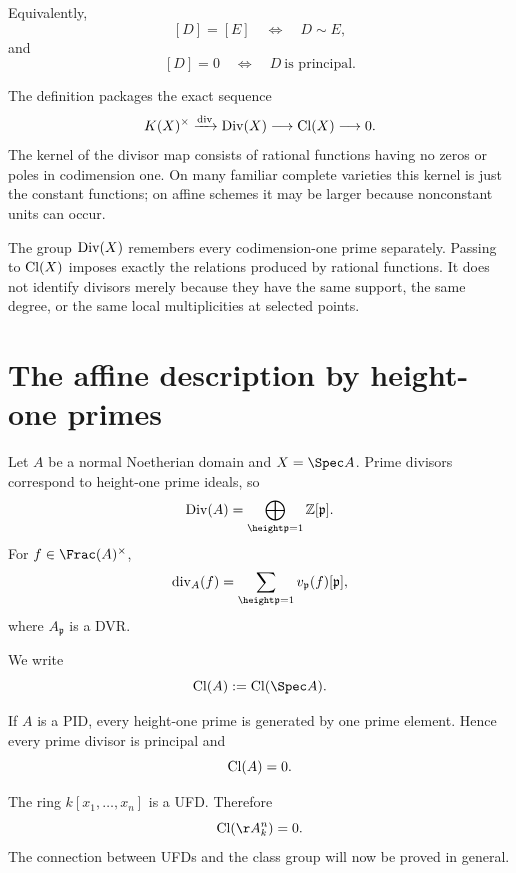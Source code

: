 Equivalently,
\[
 [D]=[E]\quad\Longleftrightarrow\quad D\sim E,
\]
and
\[
 [D]=0\quad\Longleftrightarrow\quad D\ \text{is principal}.
\]

The definition packages the exact sequence
\[
 K(X)^\times
 \xrightarrow{\operatorname{div}}
 \operatorname{Div}(X)
 \longrightarrow
 \operatorname{Cl}(X)
 \longrightarrow0.
\]
The kernel of the divisor map consists of rational functions having no zeros or poles in codimension one. On many familiar complete varieties this kernel is just the constant functions; on affine schemes it may be larger because nonconstant units can occur.



\begin{remark}
The group \(\operatorname{Div}(X)\) remembers every codimension-one prime separately. Passing to \(\operatorname{Cl}(X)\) imposes exactly the relations produced by rational functions. It does not identify divisors merely because they have the same support, the same degree, or the same local multiplicities at selected points.
\end{remark}

\section{The affine description by height-one primes}

Let \(A\) be a normal Noetherian domain and \(X=\Spec A\). Prime divisors correspond to height-one prime ideals, so
\[
  \Div(A)
  =
  \bigoplus_{\height\mathfrak p=1}\mathbb Z[\mathfrak p].
\]
For \(f\in\Frac(A)^\times\),
\[
  \operatorname{div}_A(f)
  =
  \sum_{\height\mathfrak p=1}
  v_{\mathfrak p}(f)[\mathfrak p],
\]
where \(A_{\mathfrak p}\) is a DVR.

We write
\[
  \Cl(A):=\Cl(\Spec A).
\]

\begin{example}[A PID]\label{ex:vi41-pid}
If \(A\) is a PID, every height-one prime is generated by one prime element. Hence every prime divisor is principal and
\[
  \operatorname{Cl}(A)=0.
\]
\end{example}

\begin{example}\label{ex:vi41-polynomial-ring}
The ring \(k[x_1,\ldots,x_n]\) is a UFD. Therefore
\[
  \Cl(\AA^n_k)=0.
\]
The connection between UFDs and the class group will now be proved in general.
\end{example}

